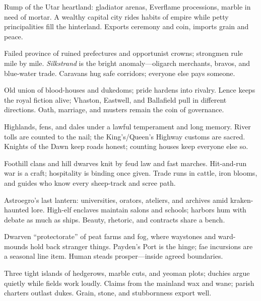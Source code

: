 \documentclass[11pt]{article}
\begin{document}
\begin{description}[leftmargin=2.2cm]
  \item[Ecktoria] Rump of the Utar heartland: gladiator arenas, Everflame processions, marble in need of mortar. A wealthy capital city rides habits of empire while petty principalities fill the hinterland. Exports ceremony and coin, imports grain and peace.

  \item[Acasia] Failed province of ruined prefectures and opportunist crowns; strongmen rule mile by mile. \emph{Silkstrand} is the bright anomaly—oligarch merchants, bravos, and blue-water trade. Caravans hug safe corridors; everyone else pays someone.

  \item[Vhasia] Old union of blood-houses and dukedoms; pride hardens into rivalry. Lence keeps the royal fiction alive; Vhaston, Eastwell, and Ballafield pull in different directions. Oath, marriage, and musters remain the coin of governance.

  \item[Viterra] Highlands, fens, and dales under a lawful temperament and long memory. River tolls are counted to the nail; the King’s/Queen’s Highway customs are sacred. Knights of the Dawn keep roads honest; counting houses keep everyone else so.

  \item[Ubral] Foothill clans and hill dwarves knit by feud law and fast marches. Hit-and-run war is a craft; hospitality is binding once given. Trade runs in cattle, iron blooms, and guides who know every sheep-track and scree path.

  \item[Thepyrgos] Astroegro’s last lantern: universities, orators, ateliers, and archives amid kraken-haunted lore. High-elf enclaves maintain salons and schools; harbors hum with debate as much as ships. Beauty, rhetoric, and contracts share a bench.

  \item[Mistlands] Dwarven “protectorate” of peat farms and fog, where waystones and ward-mounds hold back stranger things. Payden’s Port is the hinge; fae incursions are a seasonal line item. Human steads prosper—inside agreed boundaries.

  \item[Theona] Three tight islands of hedgerows, marble cuts, and yeoman plots; duchies argue quietly while fields work loudly. Claims from the mainland wax and wane; parish charters outlast dukes. Grain, stone, and stubbornness export well.


\end{description}
\end{document}
